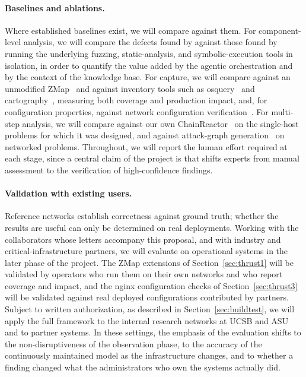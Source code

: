 \paragraph{Baselines and ablations.}
Where established baselines exist, we will compare against them. For
component-level analysis, we will compare the defects found by \sysname
against those found by running the underlying fuzzing, static-analysis, and
symbolic-execution tools in isolation, in order to quantify the value added
by the agentic orchestration and by the context of the knowledge base. For
capture, we will compare against an unmodified ZMap~\cite{zmap} and against
inventory tools such as osquery~\cite{osquery} and
cartography~\cite{cartography}, measuring both coverage and production
impact, and, for configuration properties, against network configuration
verification~\cite{batfish}. For multi-step analysis, we will compare against
our own ChainReactor~\cite{chainreactor} on the single-host problems for
which it was designed, and against attack-graph generation~\cite{mulval} on
networked problems. Throughout, we will report the human effort required at
each stage, since a central claim of the project is that \sysname shifts
experts from manual assessment to the verification of high-confidence
findings.

\paragraph{Validation with existing users.}
Reference networks establish correctness against ground truth; whether the
results are useful can only be determined on real deployments. Working with the collaborators whose letters accompany this
proposal, and with industry and critical-infrastructure partners, we will
evaluate \sysname on operational systems in the later phase of the project.
The ZMap extensions of Section~\ref{sec:thrust1} will be validated by
operators who run them on their own networks and who report coverage and
impact, and the nginx configuration checks of Section~\ref{sec:thrust3} will
be validated against real deployed configurations contributed by
partners. Subject to written authorization, as described in
Section~\ref{sec:buildtest}, we will apply the full framework to the internal
research networks at UCSB and ASU and to partner systems. In these settings,
the emphasis of the evaluation shifts to the non-disruptiveness of the
observation phase, to the accuracy of the continuously maintained model as
the infrastructure changes, and to whether a finding changed what the
administrators who own the systems actually did.

